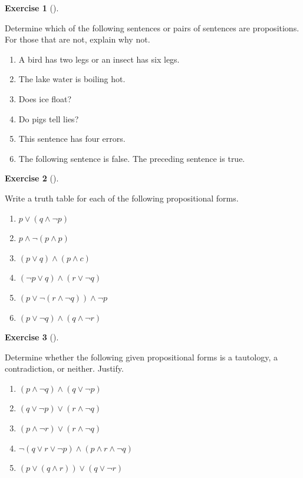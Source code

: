\documentclass[
  letterpaper,
  10pt,
  reqno,
  twopage,
  openany]{book}
\providecommand{\tightlist}{%
  \setlength{\itemsep}{0pt}\setlength{\parskip}{0pt}}\usepackage{longtable,booktabs,array}
\theoremstyle{plain}
\theoremstyle{definition}
\newtheorem{exercise}{Exercise}[chapter]
\theoremstyle{definition}
\theoremstyle{definition}
\theoremstyle{plain}
\theoremstyle{plain}
\theoremstyle{remark}
\begin{document}
\leavevmode{}%
\begin{exercise}[]\label{exr-propositions}

Determine which of the following sentences or pairs of sentences are
propositions. For those that are not, explain why not.

\begin{enumerate}
\def\labelenumi{\arabic{enumi}.}
\tightlist
\item
  A bird has two legs or an insect has six legs.
\item
  The lake water is boiling hot.
\item
  Does ice float?
\item
  Do pigs tell lies?
\item
  This sentence has four errors.
\item
  The following sentence is false. The preceding sentence is true.
\end{enumerate}

\end{exercise}

\leavevmode{}%
\begin{exercise}[]\label{exr-truth-table}

Write a truth table for each of the following propositional forms.

\begin{enumerate}
\def\labelenumi{\arabic{enumi}.}
\tightlist
\item
  \(p\lor (q \land \neg p)\)
\item
  \(p\land \neg(p\land p)\)
\item
  \((p\lor q)\land (p\land c)\)
\item
  \((\neg p\lor q)\land (r\lor \neg q)\)
\item
  \((p\lor \neg (r\land \neg q))\land \neg p\)
\item
  \((p \lor \neg q)\land (q\land \neg r)\)
\end{enumerate}

\end{exercise}

\leavevmode{}%
\begin{exercise}[]\label{exr-propositional-forms}

Determine whether the following given propositional forms is a
tautology, a contradiction, or neither. Justify.

\begin{enumerate}
\def\labelenumi{\arabic{enumi}.}
\tightlist
\item
  \((p\land \neg q)\land (q\lor \neg p)\)
\item
  \((q\lor \neg p)\lor(r\land \neg q)\)
\item
  \((p\land \neg r)\lor (r\land \neg q)\)
\item
  \(\neg(q\lor r\lor \neg p)\land (p\land r\land \neg q)\)
\item
  \((p\lor (q\land r))\lor (q\lor \neg r)\)
\end{enumerate}

\end{exercise}
\end{document}
